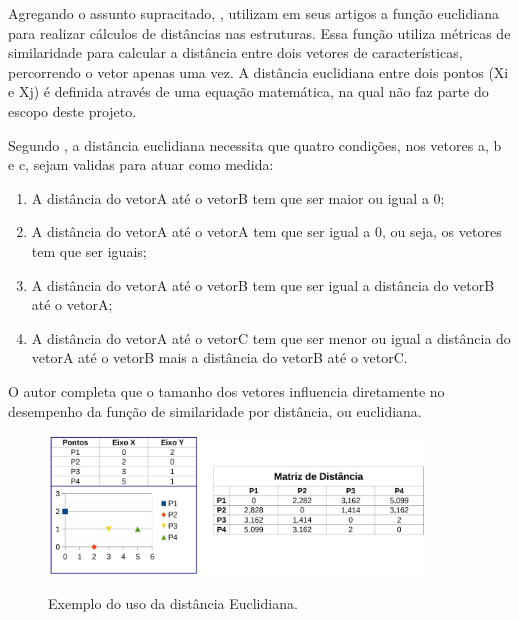 Agregando o assunto supracitado, ,  utilizam em seus artigos a função euclidiana para realizar cálculos de distâncias nas estruturas. Essa função utiliza métricas de similaridade para calcular a distância entre dois vetores de características, percorrendo o vetor apenas uma vez. A distância euclidiana entre dois pontos (Xi e Xj) é definida através de uma equação matemática, na qual não faz parte do escopo deste projeto.

%

Segundo , a distância euclidiana necessita que quatro condições, nos vetores a, b e c, sejam validas para atuar como medida:

\begin{enumerate}
    \item A distância do vetorA até o vetorB tem que ser maior ou igual a 0;
    \item A distância do vetorA até o vetorA tem que ser igual a 0, ou seja, os vetores tem que ser iguais;
    \item A distância do vetorA até o vetorB tem que ser igual a distância do vetorB até o vetorA;
    \item A distância do vetorA até o vetorC tem que ser menor ou igual a distância do vetorA até o vetorB mais a distância do vetorB até o vetorC.
\end{enumerate}

O autor completa que o tamanho dos vetores influencia diretamente no desempenho da função de similaridade por distância, ou euclidiana.


\begin{figure}[!h]
\caption{{\footnotesize Exemplo do uso da distância Euclidiana.}}
 
\centering %
\includegraphics[width=10cm]{revisao-bibliografica/Figuras/Euclidiana.jpg}%
\label{figura:figura8}

\centering {}
{
\label{figura:figura8}
}
\end{figure}
